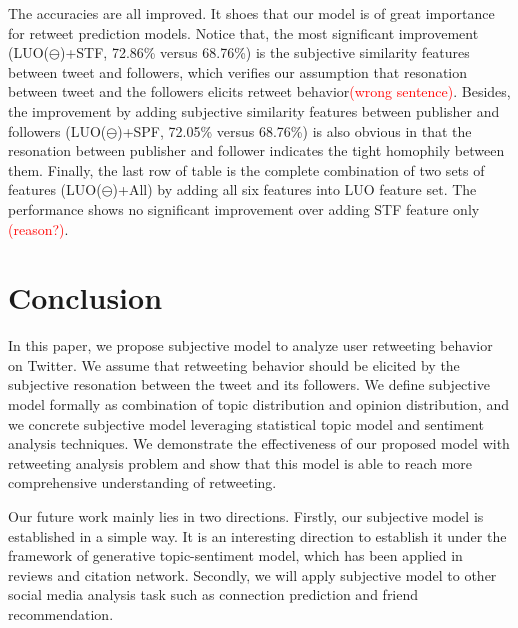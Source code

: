 \documentclass{acm_proc_article-sp}
\newcommand{\mo}[1]{\textcolor{red}{#1}}
\begin{document}
The accuracies are all improved. It shoes that our model is of great importance for retweet prediction models. 
Notice that, the most significant improvement (LUO($ \ominus $)+STF, 72.86\% versus 68.76\%) is the subjective similarity features between tweet and followers, which verifies our assumption that resonation between tweet and the followers elicits retweet behavior\mo{(wrong sentence)}.
Besides, the improvement by adding subjective similarity features between publisher and followers (LUO($ \ominus $)+SPF, 72.05\% versus 68.76\%) is also obvious in that the resonation between publisher and follower indicates the tight homophily between them.
Finally, the last row of table is the complete combination of two sets of features (LUO($ \ominus $)+All) by adding all six features into LUO feature set. The performance shows no significant improvement over adding STF feature only \mo{(reason?)}.
\section{Conclusion}
In this paper, we propose subjective model to analyze user retweeting behavior on Twitter. We assume that retweeting behavior should be elicited by the subjective resonation between the tweet and its followers. 
We define subjective model formally as combination of topic distribution and opinion distribution, and we concrete subjective model leveraging statistical topic model and sentiment analysis techniques.
We demonstrate the effectiveness of our proposed model with retweeting analysis problem and show that this model is able to reach more comprehensive understanding of retweeting. 

Our future work mainly lies in two directions.
Firstly, our subjective model is established in a simple way. It is an interesting direction to establish it under the framework of generative topic-sentiment model, which has been applied in reviews and citation network.
Secondly, we will apply subjective model to other social media analysis task such as connection prediction and friend recommendation.


\end{document}
